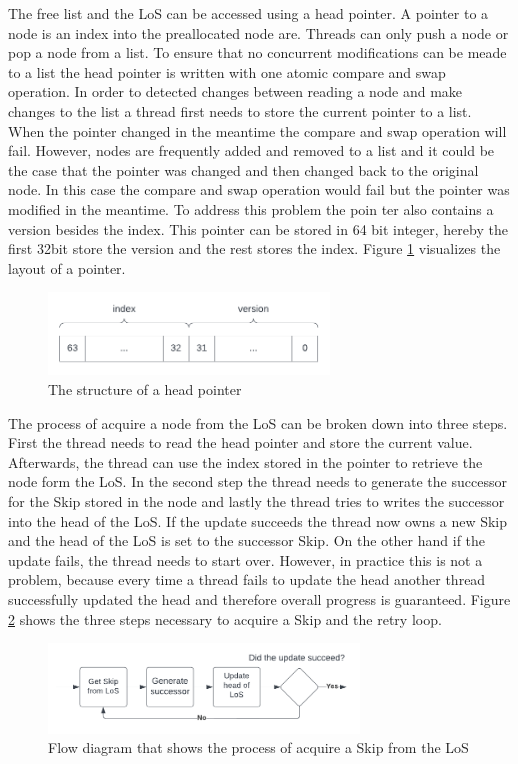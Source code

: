 \documentclass[sigconf,nonacm]{acmart}
\begin{document}
        The free list and the LoS can be accessed using a head pointer. A pointer to a node is an index into the preallocated node are. Threads can only push a node or pop a node from a list. To ensure that no concurrent modifications can be meade to a list the head pointer is written with one atomic compare and swap operation. In order to detected changes between reading a node and make changes to the list a thread first needs to store the current pointer to a list. When the pointer changed in the meantime the compare and swap operation will fail. However, nodes are frequently added and removed to a list and it could be the case that the pointer was changed and then changed back to the original node. In this case the compare and swap operation would fail but the pointer was modified in the meantime. To address this problem the poin
        ter also contains a version besides the index. This pointer can be stored in 64 bit integer, hereby the first 32bit store the version and the rest stores the index. Figure \ref{fig:pointer} visualizes the layout of a pointer.
        \begin{figure}[H]
            \includegraphics[height=2.2cm]{figure4.pdf}
            \caption{The structure of a head pointer}
            \label{fig:pointer}
        \end{figure}  

        The process of acquire a node from the LoS can be broken down into three steps. First the thread needs to read the head pointer and store the current value. Afterwards, the thread can use the index stored in the pointer to retrieve the node form the LoS. In the second step the thread needs to generate the successor for the Skip stored in the node and lastly the thread tries to writes the successor into the head of the LoS. If the update succeeds the thread now owns a new Skip and the head of the LoS is set to the successor Skip. On the other hand if the update fails, the thread needs to start over. However, in practice this is not a problem, because every time a thread fails to update the head another thread successfully updated the head and therefore overall progress is guaranteed. Figure \ref{fig:acquire} shows the three steps necessary to acquire a Skip and the retry loop.
        \begin{figure}[H]
            \includegraphics[height=2.4cm]{figure5.pdf}
            \caption{Flow diagram that shows the process of acquire a Skip from the LoS}
            \label{fig:acquire}
        \end{figure}
\end{document}
